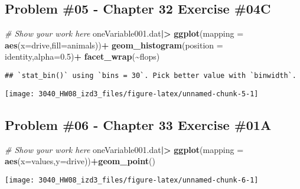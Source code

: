 \documentclass[
]{article}
\newenvironment{Shaded}{\begin{snugshade}}{\end{snugshade}}
\newcommand{\AttributeTok}[1]{\textcolor[rgb]{0.13,0.29,0.53}{#1}}
\newcommand{\CommentTok}[1]{\textcolor[rgb]{0.56,0.35,0.01}{\textit{#1}}}
\newcommand{\FloatTok}[1]{\textcolor[rgb]{0.00,0.00,0.81}{#1}}
\newcommand{\FunctionTok}[1]{\textcolor[rgb]{0.13,0.29,0.53}{\textbf{#1}}}
\newcommand{\NormalTok}[1]{#1}
\newcommand{\SpecialCharTok}[1]{\textcolor[rgb]{0.81,0.36,0.00}{\textbf{#1}}}
\newcommand{\StringTok}[1]{\textcolor[rgb]{0.31,0.60,0.02}{#1}}
\begin{document}
\newpage

\hypertarget{problem-05---chapter-32-exercise-04c}{%
\subsection{Problem \#05 - Chapter 32 Exercise
\#04C}\label{problem-05---chapter-32-exercise-04c}}

\begin{Shaded}
\begin{Highlighting}[]
\CommentTok{\# Show your work here}
\NormalTok{oneVariable001.dat}\SpecialCharTok{|\textgreater{}}
  \FunctionTok{ggplot}\NormalTok{(}\AttributeTok{mapping =} \FunctionTok{aes}\NormalTok{(}\AttributeTok{x=}\NormalTok{drive,}\AttributeTok{fill=}\NormalTok{animals))}\SpecialCharTok{+}
  \FunctionTok{geom\_histogram}\NormalTok{(}\AttributeTok{position =} \StringTok{\textquotesingle{}identity\textquotesingle{}}\NormalTok{,}\AttributeTok{alpha=}\FloatTok{0.5}\NormalTok{)}\SpecialCharTok{+}
  \FunctionTok{facet\_wrap}\NormalTok{(}\SpecialCharTok{\textasciitilde{}}\NormalTok{flops)}
\end{Highlighting}
\end{Shaded}

\begin{verbatim}
## `stat_bin()` using `bins = 30`. Pick better value with `binwidth`.
\end{verbatim}

\texttt{[image: 3040\_HW08\_izd3\_files/figure-latex/unnamed-chunk-5-1]}

\newpage

\hypertarget{problem-06---chapter-33-exercise-01a}{%
\subsection{Problem \#06 - Chapter 33 Exercise
\#01A}\label{problem-06---chapter-33-exercise-01a}}

\begin{Shaded}
\begin{Highlighting}[]
\CommentTok{\# Show your work here}
\NormalTok{oneVariable001.dat}\SpecialCharTok{|\textgreater{}}
  \FunctionTok{ggplot}\NormalTok{(}\AttributeTok{mapping =} \FunctionTok{aes}\NormalTok{(}\AttributeTok{x=}\NormalTok{values,}\AttributeTok{y=}\NormalTok{drive))}\SpecialCharTok{+}\FunctionTok{geom\_point}\NormalTok{()}
\end{Highlighting}
\end{Shaded}

\texttt{[image: 3040\_HW08\_izd3\_files/figure-latex/unnamed-chunk-6-1]}
\end{document}
